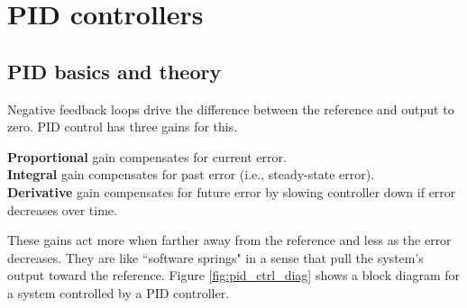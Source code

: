 
\chapter{PID controllers}

\section{PID basics and theory}

Negative feedback loops drive the difference between the \gls{reference} and
\gls{output} to zero. PID control has three gains for this.

\textbf{Proportional} gain compensates for current \gls{error}. \\
\textbf{Integral} gain compensates for past error (i.e.,
\gls{steady-state error}). \\
\textbf{Derivative} gain compensates for future error by slowing controller down
  if error decreases over time.

These gains act more when farther away from the \gls{reference} and less as the
error decreases. They are like ``software springs" in a sense that pull the
system's \gls{output} toward the \gls{reference}. Figure \ref{fig:pid_ctrl_diag}
shows a block diagram for a system controlled by a PID controller.

